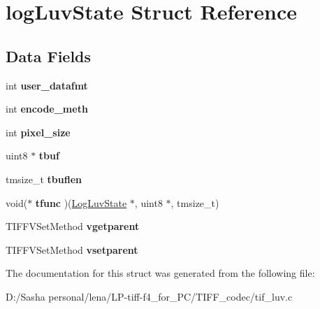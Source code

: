 \hypertarget{structlog_luv_state}{}\section{log\+Luv\+State Struct Reference}
\label{structlog_luv_state}
\subsection*{Data Fields}
\begin{DoxyCompactItemize}
\item 
\hypertarget{structlog_luv_state_a2d95d249e8c755b63778ebd3a62a5be5}{}int {\bfseries user\+\_\+datafmt}\label{structlog_luv_state_a2d95d249e8c755b63778ebd3a62a5be5}

\item 
\hypertarget{structlog_luv_state_a886583208bb791a01cd6f1a8ed20beac}{}int {\bfseries encode\+\_\+meth}\label{structlog_luv_state_a886583208bb791a01cd6f1a8ed20beac}

\item 
\hypertarget{structlog_luv_state_acd81fd453ed1487e389a56357783fda7}{}int {\bfseries pixel\+\_\+size}\label{structlog_luv_state_acd81fd453ed1487e389a56357783fda7}

\item 
\hypertarget{structlog_luv_state_a2dc7bdb02eea6f1fc3692703a55ed08f}{}uint8 $\ast$ {\bfseries tbuf}\label{structlog_luv_state_a2dc7bdb02eea6f1fc3692703a55ed08f}

\item 
\hypertarget{structlog_luv_state_adbc2f86c13f4b9460c150020c02b189a}{}tmsize\+\_\+t {\bfseries tbuflen}\label{structlog_luv_state_adbc2f86c13f4b9460c150020c02b189a}

\item 
\hypertarget{structlog_luv_state_a4ffa5fc4fa382ef6ec09a5e8a2566257}{}void($\ast$ {\bfseries tfunc} )(\hyperlink{structlog_luv_state}{Log\+Luv\+State} $\ast$, uint8 $\ast$, tmsize\+\_\+t)\label{structlog_luv_state_a4ffa5fc4fa382ef6ec09a5e8a2566257}

\item 
\hypertarget{structlog_luv_state_ad2d818e46661b02e6ad3285f23dabeb0}{}T\+I\+F\+F\+V\+Set\+Method {\bfseries vgetparent}\label{structlog_luv_state_ad2d818e46661b02e6ad3285f23dabeb0}

\item 
\hypertarget{structlog_luv_state_ad3e8072d4883a6686f64fb7671e9b3c1}{}T\+I\+F\+F\+V\+Set\+Method {\bfseries vsetparent}\label{structlog_luv_state_ad3e8072d4883a6686f64fb7671e9b3c1}

\end{DoxyCompactItemize}


The documentation for this struct was generated from the following file\+:\begin{DoxyCompactItemize}
\item 
D\+:/\+Sasha personal/lena/\+L\+P-\/tiff-\/f4\+\_\+for\+\_\+\+P\+C/\+T\+I\+F\+F\+\_\+codec/tif\+\_\+luv.\+c\end{DoxyCompactItemize}
